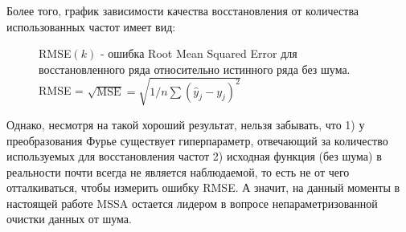 Более того, график зависимости качества восстановления от количества использованных частот имеет вид:
\begin{figure}[H]
	\centering
	\caption{RMSE$(k)$ - ошибка Root Mean Squared Error для восстановленного ряда относительно истинного ряда без шума. RMSE = $\sqrt{\text{MSE}} = \sqrt{1 / n \sum(\hat{y}_j - y_j)^2}$}
\end{figure}
Однако, несмотря на такой хороший результат, нельзя забывать, что 1) у преобразования Фурье существует гиперпараметр, отвечающий за количество используемых для восстановления частот 2) исходная функция (без шума) в реальности почти всегда не является наблюдаемой, то есть не от чего отталкиваться, чтобы измерить ошибку RMSE. А значит, на данный моменты в настоящей работе MSSA остается лидером в вопросе непараметризованной очистки данных от шума.

